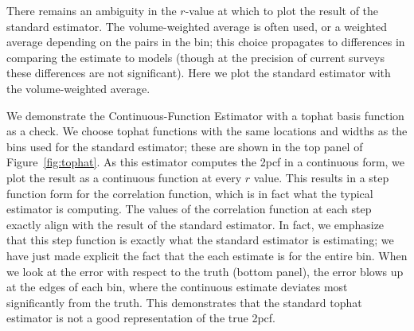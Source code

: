 \documentclass[modern]{aastex62}
\newcommand{\cf}{2pcf\xspace} %
\newcommand{\est}{the Continuous-Function Estimator\xspace}
\begin{document}
There remains an ambiguity in the $r$-value at which to plot the result of the standard estimator. 
The volume-weighted average is often used, or a weighted average depending on the pairs in the bin; this choice propagates to differences in comparing the estimate to models (though at the precision of current surveys these differences are not significant).
Here we plot the standard estimator with the volume-weighted average.

We demonstrate \est with a tophat basis function as a check.
We choose tophat functions with the same locations and widths as the bins used for the standard estimator; these are shown in the top panel of Figure~\ref{fig:tophat}. 
As this estimator computes the \cf in a continuous form, we plot the result as a continuous function at every $r$ value.
This results in a step function form for the correlation function, which is in fact what the typical estimator is computing.
The values of the correlation function at each step exactly align with the result of the standard estimator.
In fact, we emphasize that this step function is exactly what the standard estimator is estimating; we have just made explicit the fact that the each estimate is for the entire bin.
When we look at the error with respect to the truth (bottom panel), the error blows up at the edges of each bin, where the continuous estimate deviates most significantly from the truth.
This demonstrates that the standard tophat estimator is not a good representation of the true \cf.
\end{document}
